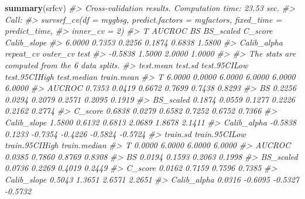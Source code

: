 \documentclass[
]{article}
\newenvironment{Shaded}{\begin{snugshade}}{\end{snugshade}}
\newcommand{\CommentTok}[1]{\textcolor[rgb]{0.56,0.35,0.01}{\textit{#1}}}
\newcommand{\FunctionTok}[1]{\textcolor[rgb]{0.13,0.29,0.53}{\textbf{#1}}}
\newcommand{\NormalTok}[1]{#1}
\begin{document}
\begin{Shaded}
\begin{Highlighting}[]
\FunctionTok{summary}\NormalTok{(srfcv)}
\CommentTok{\#\textgreater{} Cross{-}validation results. Computation time: 23.53 sec. }
\CommentTok{\#\textgreater{} Call:}
\CommentTok{\#\textgreater{} survsrf\_cv(df = mygbsg, predict.factors = myfactors, fixed\_time = predict\_time, }
\CommentTok{\#\textgreater{}     inner\_cv = 2)}
\CommentTok{\#\textgreater{}           T      AUCROC          BS   BS\_scaled     C\_score Calib\_slope }
\CommentTok{\#\textgreater{}      6.0000      0.7353      0.2256      0.1874      0.6838      1.5800 }
\CommentTok{\#\textgreater{} Calib\_alpha   repeat\_cv    outer\_cv        test }
\CommentTok{\#\textgreater{}     {-}0.5838      1.5000      2.0000      1.0000 }
\CommentTok{\#\textgreater{} }
\CommentTok{\#\textgreater{} The stats are computed from the  6  data splits.}
\CommentTok{\#\textgreater{}             test.mean test.sd test.95CILow test.95CIHigh test.median train.mean}
\CommentTok{\#\textgreater{} T              6.0000  0.0000       6.0000        6.0000      6.0000     6.0000}
\CommentTok{\#\textgreater{} AUCROC         0.7353  0.0419       0.6672        0.7699      0.7438     0.8293}
\CommentTok{\#\textgreater{} BS             0.2256  0.0294       0.2079        0.2571      0.2095     0.1919}
\CommentTok{\#\textgreater{} BS\_scaled      0.1874  0.0559       0.1277        0.2226      0.2162     0.2774}
\CommentTok{\#\textgreater{} C\_score        0.6838  0.0279       0.6582        0.7252      0.6752     0.7366}
\CommentTok{\#\textgreater{} Calib\_slope    1.5800  0.6132       0.6813        2.0689      1.8678     2.1411}
\CommentTok{\#\textgreater{} Calib\_alpha   {-}0.5838  0.1233      {-}0.7354       {-}0.4226     {-}0.5824    {-}0.5724}
\CommentTok{\#\textgreater{}             train.sd train.95CILow train.95CIHigh train.median}
\CommentTok{\#\textgreater{} T             0.0000        6.0000         6.0000       6.0000}
\CommentTok{\#\textgreater{} AUCROC        0.0385        0.7860         0.8769       0.8308}
\CommentTok{\#\textgreater{} BS            0.0194        0.1593         0.2063       0.1998}
\CommentTok{\#\textgreater{} BS\_scaled     0.0736        0.2269         0.4019       0.2449}
\CommentTok{\#\textgreater{} C\_score       0.0162        0.7159         0.7596       0.7385}
\CommentTok{\#\textgreater{} Calib\_slope   0.5043        1.3651         2.6571       2.2651}
\CommentTok{\#\textgreater{} Calib\_alpha   0.0316       {-}0.6095        {-}0.5327      {-}0.5732}
\end{Highlighting}
\end{Shaded}
\end{document}
